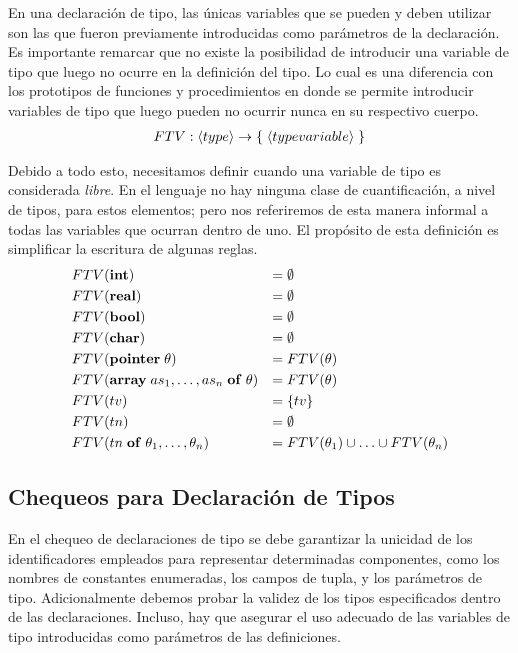En una declaración de tipo, las únicas variables que se pueden y deben utilizar son las que fueron previamente introducidas como parámetros de la declaración.
Es importante remarcar que no existe la posibilidad de introducir una variable de tipo que luego no ocurre en la definición del tipo.
Lo cual es una diferencia con los prototipos de funciones y procedimientos en donde se permite introducir variables de tipo que luego pueden no ocurrir nunca en su respectivo cuerpo.
\begin{gather*}
FTV: \langle type \rangle \rightarrow \{ \; \langle typevariable \rangle \; \}
\end{gather*}

Debido a todo esto, necesitamos definir cuando una variable de tipo es considerada \textit{libre}.
En el lenguaje no hay ninguna clase de cuantificación, a nivel de tipos, para estos elementos; pero nos referiremos de esta manera informal a todas las variables que ocurran dentro de uno.
El propósito de esta definición es simplificar la escritura de algunas reglas.
\begin{align*}
&FTV(\mathbf{int})
&=&\;
\emptyset
\\
&FTV(\mathbf{real})
&=&\;
\emptyset
\\
&FTV(\mathbf{bool})
&=&\;
\emptyset
\\
&FTV(\mathbf{char})
&=&\;
\emptyset
\\
&FTV(\mathbf{pointer} \; \theta)
&=&\;
FTV(\theta)
\\
&FTV(\mathbf{array} \; as_1, \ldots, as_n \; \mathbf{of} \; \theta)
&=&\;
FTV(\theta)
\\
&FTV(tv)
&=&\;
\{ tv \}
\\
&FTV(tn)
&=&\;
\emptyset
\\
&FTV(tn \; \mathbf{of} \; \theta_1, \ldots, \theta_n)
&=&\;
FTV(\theta_1) \cup \ldots \cup FTV(\theta_n)
\end{align*}

\subsection{Chequeos para Declaración de Tipos}

En el chequeo de declaraciones de tipo se debe garantizar la unicidad de los identificadores empleados para representar determinadas componentes, como los nombres de constantes enumeradas, los campos de tupla, y los parámetros de tipo.
Adicionalmente debemos probar la validez de los tipos especificados dentro de las declaraciones.
Incluso, hay que asegurar el uso adecuado de las variables de tipo introducidas como parámetros de las definiciones.

